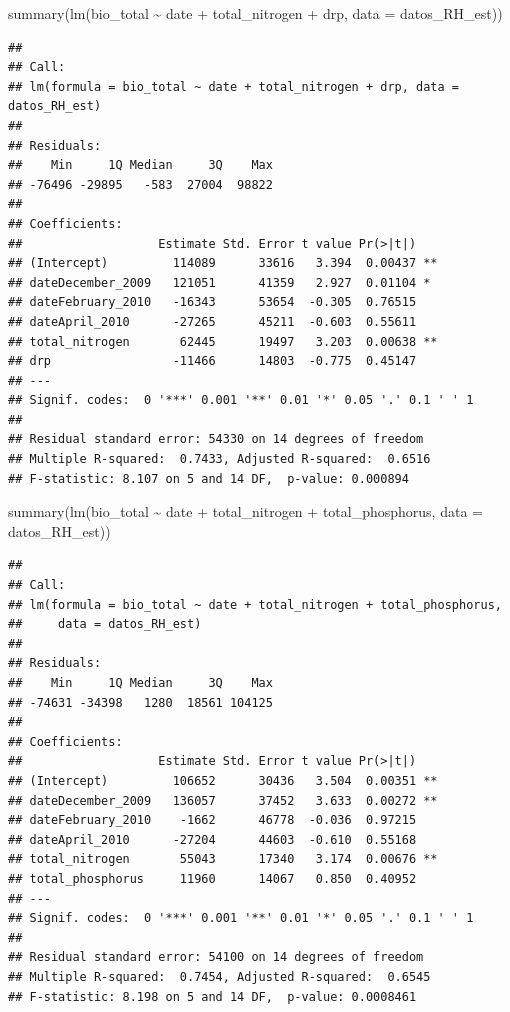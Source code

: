 \documentclass[
]{book}
\newenvironment{Shaded}{\begin{snugshade}}{\end{snugshade}}
\newcommand{\AttributeTok}[1]{\textcolor[rgb]{0.77,0.63,0.00}{#1}}
\newcommand{\FunctionTok}[1]{\textcolor[rgb]{0.00,0.00,0.00}{#1}}
\newcommand{\NormalTok}[1]{#1}
\newcommand{\SpecialCharTok}[1]{\textcolor[rgb]{0.00,0.00,0.00}{#1}}
\begin{document}
\begin{Shaded}
\begin{Highlighting}[]
\FunctionTok{summary}\NormalTok{(}\FunctionTok{lm}\NormalTok{(bio\_total }\SpecialCharTok{\textasciitilde{}}\NormalTok{ date }\SpecialCharTok{+}\NormalTok{ total\_nitrogen }\SpecialCharTok{+}\NormalTok{ drp, }\AttributeTok{data =}\NormalTok{ datos\_RH\_est)) }
\end{Highlighting}
\end{Shaded}

\begin{verbatim}
## 
## Call:
## lm(formula = bio_total ~ date + total_nitrogen + drp, data = datos_RH_est)
## 
## Residuals:
##    Min     1Q Median     3Q    Max 
## -76496 -29895   -583  27004  98822 
## 
## Coefficients:
##                   Estimate Std. Error t value Pr(>|t|)   
## (Intercept)         114089      33616   3.394  0.00437 **
## dateDecember_2009   121051      41359   2.927  0.01104 * 
## dateFebruary_2010   -16343      53654  -0.305  0.76515   
## dateApril_2010      -27265      45211  -0.603  0.55611   
## total_nitrogen       62445      19497   3.203  0.00638 **
## drp                 -11466      14803  -0.775  0.45147   
## ---
## Signif. codes:  0 '***' 0.001 '**' 0.01 '*' 0.05 '.' 0.1 ' ' 1
## 
## Residual standard error: 54330 on 14 degrees of freedom
## Multiple R-squared:  0.7433, Adjusted R-squared:  0.6516 
## F-statistic: 8.107 on 5 and 14 DF,  p-value: 0.000894
\end{verbatim}

\begin{Shaded}
\begin{Highlighting}[]
\FunctionTok{summary}\NormalTok{(}\FunctionTok{lm}\NormalTok{(bio\_total }\SpecialCharTok{\textasciitilde{}}\NormalTok{ date }\SpecialCharTok{+}\NormalTok{ total\_nitrogen }\SpecialCharTok{+}\NormalTok{ total\_phosphorus, }\AttributeTok{data =}\NormalTok{ datos\_RH\_est)) }
\end{Highlighting}
\end{Shaded}

\begin{verbatim}
## 
## Call:
## lm(formula = bio_total ~ date + total_nitrogen + total_phosphorus, 
##     data = datos_RH_est)
## 
## Residuals:
##    Min     1Q Median     3Q    Max 
## -74631 -34398   1280  18561 104125 
## 
## Coefficients:
##                   Estimate Std. Error t value Pr(>|t|)   
## (Intercept)         106652      30436   3.504  0.00351 **
## dateDecember_2009   136057      37452   3.633  0.00272 **
## dateFebruary_2010    -1662      46778  -0.036  0.97215   
## dateApril_2010      -27204      44603  -0.610  0.55168   
## total_nitrogen       55043      17340   3.174  0.00676 **
## total_phosphorus     11960      14067   0.850  0.40952   
## ---
## Signif. codes:  0 '***' 0.001 '**' 0.01 '*' 0.05 '.' 0.1 ' ' 1
## 
## Residual standard error: 54100 on 14 degrees of freedom
## Multiple R-squared:  0.7454, Adjusted R-squared:  0.6545 
## F-statistic: 8.198 on 5 and 14 DF,  p-value: 0.0008461
\end{verbatim}
\end{document}
